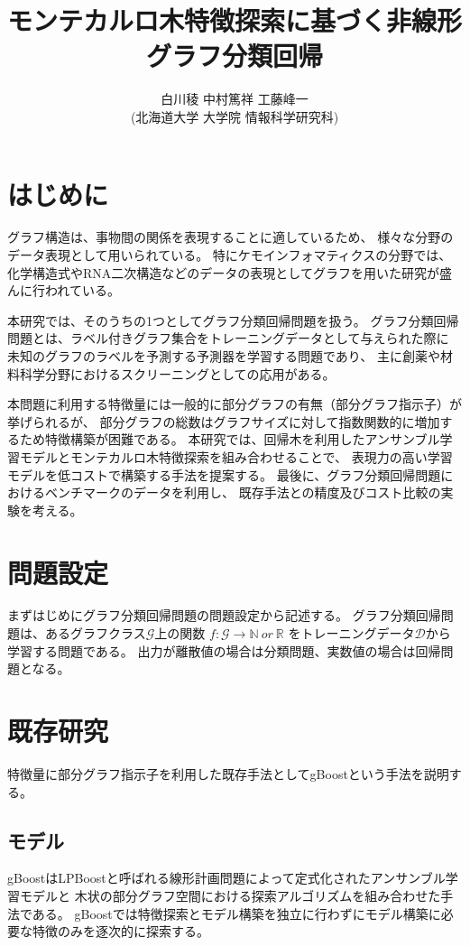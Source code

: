 \documentclass[a4paper,10.5pt]{jsarticle}           %
\author{白川稜\Email{sira@ist.hokudai.ac.jp}
\hspace{5mm}中村篤祥 \hspace{5mm}工藤峰一\\
(北海道大学 大学院 情報科学研究科)\contactto{札幌市北区北14条西9丁目北海道大学大学院情報科学研究科}}
\title{モンテカルロ木特徴探索に基づく非線形グラフ分類回帰}
\begin{document}
\maketitle

\section{はじめに}
グラフ構造は、事物間の関係を表現することに適しているため、
様々な分野のデータ表現として用いられている。
特にケモインフォマティクスの分野では、
化学構造式やRNA二次構造などのデータの表現としてグラフを用いた研究が盛んに行われている。

本研究では、そのうちの1つとしてグラフ分類回帰問題を扱う。
グラフ分類回帰問題とは、ラベル付きグラフ集合をトレーニングデータとして与えられた際に
未知のグラフのラベルを予測する予測器を学習する問題であり、
主に創薬や材料科学分野におけるスクリーニングとしての応用がある。

本問題に利用する特徴量には一般的に部分グラフの有無（部分グラフ指示子）が挙げられるが、
部分グラフの総数はグラフサイズに対して指数関数的に増加するため特徴構築が困難である。
本研究では、回帰木を利用したアンサンブル学習モデルとモンテカルロ木特徴探索を組み合わせることで、
表現力の高い学習モデルを低コストで構築する手法を提案する。
最後に、グラフ分類回帰問題におけるベンチマークのデータを利用し、
既存手法との精度及びコスト比較の実験を考える。

\section{問題設定}
まずはじめにグラフ分類回帰問題の問題設定から記述する。
グラフ分類回帰問題は、あるグラフクラス$\mathcal{G}$上の関数
$f: \mathcal{G} \rightarrow \mathbb{N}\ or\ \mathbb{R}$
をトレーニングデータ$\mathcal{D}$から学習する問題である。
出力が離散値の場合は分類問題、実数値の場合は回帰問題となる。

\section{既存研究}
特徴量に部分グラフ指示子を利用した既存手法としてgBoost\cite{gBoost}という手法を説明する。
\subsection{モデル}
gBoostはLPBoostと呼ばれる線形計画問題によって定式化されたアンサンブル学習モデルと
木状の部分グラフ空間における探索アルゴリズムを組み合わせた手法である。
gBoostでは特徴探索とモデル構築を独立に行わずにモデル構築に必要な特徴のみを逐次的に探索する。
\end{document}
